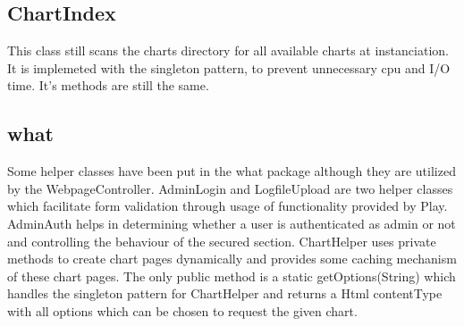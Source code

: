 \subsection{ChartIndex}
This class still scans the charts directory for all available charts at instanciation.
It is implemeted with the singleton pattern, to prevent unnecessary cpu and I/O time.
It's methods are still the same.

\subsection{what}
Some helper classes have been put in the what package although they are utilized by the WebpageController.
AdminLogin and LogfileUpload are two helper classes which facilitate form validation through usage of
functionality provided by Play.
AdminAuth helps in determining whether a user is authenticated as admin or not and controlling the behaviour
of the secured section.
ChartHelper uses private methods to create chart pages dynamically and provides some caching mechanism
of these chart pages. The only public method is a static getOptions(String) which handles the singleton pattern
for ChartHelper and returns a Html contentType with all options which can be chosen to request the given chart.


 
